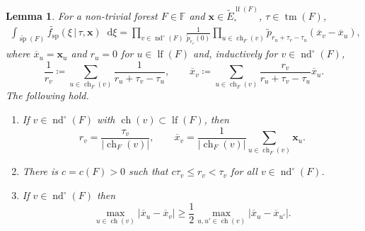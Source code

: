 \documentclass[10pt,a4paper]{amsart}
\newtheorem{lemma}{Lemma}
\DeclareMathOperator{\ch}{ch}
\DeclareMathOperator{\dcs}{sp}
\DeclareMathOperator{\dct}{tm}
\newcommand*\diff{\mathop{}\!\mathrm{d}}
\newcommand{\fsp}{f_\mathrm{sp}}
\newcommand{\interp}{\overline{x}} %
\DeclareMathOperator{\lf}{lf}
\DeclareMathOperator{\nd}{nd}
\newcommand{\rfy}[1]{\widetilde{{#1}}} %
\begin{document}
\begin{lemma}\label{lem:NFaux}
    For a non-trivial forest $F\in \mathbb{F}$ and $\boldsymbol x \in \rfy{E}^{\lf(F)}_\circ $, $\tau \in \dct(F)$,
    \begin{align}\label{eq:NFaux}
        \int_{\rfy{\dcs}(F)} \rfy{\fsp}(\xi \,\vert\,\tau,\boldsymbol x) \diff \xi = \prod_{v\in \nd^\circ (F)} \frac{1}{\rfy{p}_{r_v}(0)} \prod_{u\in \ch_F(v)} \rfy{p}_{r_u + \tau_v - \tau_u} (\interp_v -\interp_u),
    \end{align}
    where $\interp_u = \boldsymbol x_u$ and $r_u = 0$ for $u\in \lf(F)$ and, inductively for $v\in \nd^\circ (F)$, \[
        \frac{1}{r_v} \coloneqq \sum_{u\in \ch_F(v)} \frac{1}{r_u+\tau_v - \tau_u},\qquad \interp_v \coloneqq \sum_{u\in \ch_F(v)} \frac{r_v}{r_u+\tau_v - \tau_u} \interp_u.
    \] The following hold.
    \begin{enumerate}
        \item If $v\in \nd^\circ (F)$ with $\ch(v) \subset \lf(F)$, then \[
                r_v = \frac{\tau_v}{|\ch_F(v)|},\qquad \interp_v = \frac{1}{|\ch_F(v)|} \sum_{u\in \ch_F(v)} \boldsymbol x_u.
        \]
        \item There is $c = c(F) > 0$ such that $c \tau_v \le r_v < \tau_v$ for all $v\in \nd^\circ (F)$.
        \item If $v\in \nd^\circ (F)$ then \[
                \max_{u\in \ch(v)} |\interp_u-\interp_v| \ge \frac{1}{2}\max_{u,u'\in \ch(v)}|\interp_u-\interp_{u'}|.
        \]
    \end{enumerate}
\end{lemma}
\end{document}
